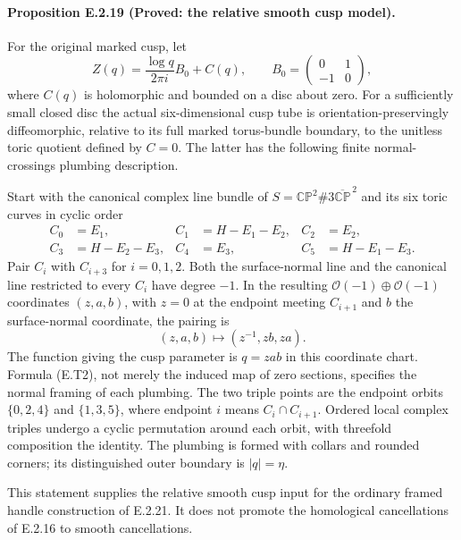 \paragraph{Proposition E.2.19 (Proved: the relative smooth cusp model).}
For the original marked cusp, let
\[
 Z(q)=\frac{\log q}{2\pi i}B_0+C(q),\qquad
 B_0=\begin{pmatrix}0&1\\-1&0\end{pmatrix},
\]
where $C(q)$ is holomorphic and bounded on a disc about zero.
For a sufficiently small closed disc the actual six-dimensional
cusp tube is orientation-preservingly diffeomorphic, relative to
its full marked torus-bundle boundary, to the unitless toric
quotient defined by $C=0$.  The latter has the following finite
normal-crossings plumbing description.

Start with the canonical complex line bundle of
$S=\mathbb {CP}^2\#3\overline{\mathbb {CP}}^{\,2}$ and its six
toric curves in cyclic order
\[
 \begin{aligned}
 C_0&=E_1,& C_1&=H-E_1-E_2,& C_2&=E_2,\\
 C_3&=H-E_2-E_3,& C_4&=E_3,& C_5&=H-E_1-E_3.
 \end{aligned}
 \tag{E.T1}
\]
Pair $C_i$ with $C_{i+3}$ for $i=0,1,2$.  Both the surface-normal
line and the canonical line restricted to every $C_i$ have degree
$-1$.  In the resulting $\mathcal O(-1)\oplus\mathcal O(-1)$
coordinates $(z,a,b)$, with $z=0$ at the endpoint meeting
$C_{i+1}$ and $b$ the surface-normal coordinate, the pairing is
\[
             (z,a,b)\longmapsto(z^{-1},zb,za).
 \tag{E.T2}
\]
The function giving the cusp parameter is $q=zab$ in this
coordinate chart.  Formula (E.T2), not merely the induced map
of zero sections, specifies the normal framing of each plumbing.
The two triple points are the endpoint orbits
$\{0,2,4\}$ and $\{1,3,5\}$, where endpoint $i$ means
$C_i\cap C_{i+1}$.  Ordered local complex triples undergo a
cyclic permutation around each orbit, with threefold composition
the identity.  The plumbing is formed with collars and rounded
corners; its distinguished outer boundary is $|q|=\eta$.

This statement supplies the relative smooth cusp input for the
ordinary framed handle construction of E.2.21.  It does not
promote the homological cancellations of E.2.16 to smooth
cancellations.

